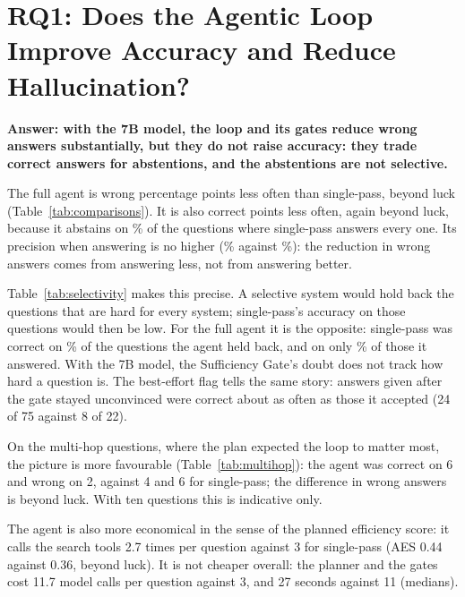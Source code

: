 \section{RQ1: Does the Agentic Loop Improve Accuracy and Reduce Hallucination?}

\textbf{Answer: with the 7B model, the loop and its gates reduce wrong answers
substantially, but they do not raise accuracy: they trade correct answers for
abstentions, and the abstentions are not selective.}

The full agent is wrong \nDiffWrongSP{} percentage points less often than single-pass,
beyond luck (Table~\ref{tab:comparisons}). It is also correct \nDiffCorrectSP{} points
less often, again beyond luck, because it abstains on \nFullAbstain\% of the questions
where single-pass answers every one. Its precision when answering is no higher
(\nFullPrec\% against \nSPPrec\%): the reduction in wrong answers comes from answering
less, not from answering better.



Table~\ref{tab:selectivity} makes this precise. A selective system would hold back the
questions that are hard for every system; single-pass's accuracy on those questions
would then be low. For the full agent it is the opposite: single-pass was correct on
\nSelFullHeld\% of the questions the agent held back, and on only \nSelFullAns\% of those
it answered. With the 7B model, the Sufficiency Gate's doubt does not track how hard a
question is. The best-effort flag tells the same story: answers given after the gate
stayed unconvinced were correct about as often as those it accepted (24 of 75 against
8 of 22).



On the \nMultihopN{} multi-hop questions, where the plan expected the loop to matter most,
the picture is more favourable (Table~\ref{tab:multihop}): the agent was correct on 6
and wrong on 2, against 4 and 6 for single-pass; the difference in wrong answers is
beyond luck. With ten questions this is indicative only.



The agent is also more economical in the sense of the planned efficiency score: it
calls the search tools 2.7 times per question against 3 for single-pass (AES 0.44
against 0.36, beyond luck). It is not cheaper overall: the planner and the gates cost
11.7 model calls per question against 3, and 27 seconds against 11 (medians).

